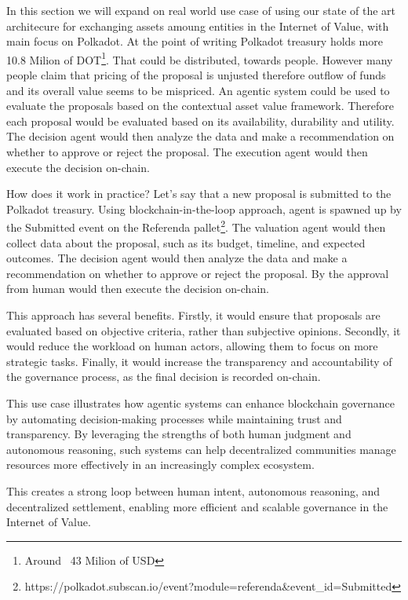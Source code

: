 In this section we will expand on real world use case of using our state of the art architecure for exchanging assets amoung entities in the Internet of Value, with main focus on Polkadot.
At the point of writing Polkadot treasury holds more 10.8 Milion of DOT\footnote{Around ~43 Milion of USD}. That could be distributed, towards people. However many people claim that pricing of the proposal is unjusted therefore outflow of funds and its overall value seems to be mispriced.
An agentic system could be used to evaluate the proposals based on the contextual asset value framework. Therefore each proposal would be evaluated based on its availability, durability and utility. The decision agent would then analyze the data and make a recommendation on whether to approve or reject the proposal. The execution agent would then execute the decision on-chain.

How does it work in practice? Let's say that a new proposal is submitted to the Polkadot treasury. Using blockchain-in-the-loop approach, agent is spawned up by the Submitted event on the Referenda pallet\footnote{https://polkadot.subscan.io/event?module=referenda&event_id=Submitted}. The valuation agent would then collect data about the proposal, such as its budget, timeline, and expected outcomes. The decision agent would then analyze the data and make a recommendation on whether to approve or reject the proposal. By the approval from human would then execute the decision on-chain.

This approach has several benefits. Firstly, it would ensure that proposals are evaluated based on objective criteria, rather than subjective opinions. Secondly, it would reduce the workload on human actors, allowing them to focus on more strategic tasks. Finally, it would increase the transparency and accountability of the governance process, as the final decision is recorded on-chain.

This use case illustrates how agentic systems can enhance blockchain governance by automating decision-making processes while maintaining trust and transparency. By leveraging the strengths of both human judgment and autonomous reasoning, such systems can help decentralized communities manage resources more effectively in an increasingly complex ecosystem.

This creates a strong loop between human intent, autonomous reasoning, and decentralized settlement, enabling more efficient and scalable governance in the Internet of Value.

